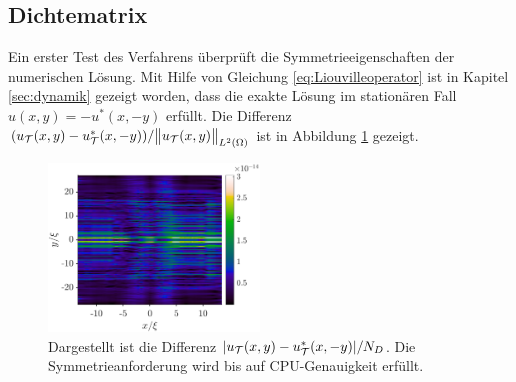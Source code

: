 \subsection{Dichtematrix}
Ein erster Test des Verfahrens überprüft die Symmetrieeigenschaften der numerischen Lösung. Mit Hilfe von Gleichung \eqref{eq:Liouvilleoperator} ist in Kapitel \ref{sec:dynamik} gezeigt worden, dass die exakte Lösung im stationären Fall $u(x,y) = -u^*(x,-y)$ erfüllt. Die Differenz $(u_{\mathcal{T}}(x,y)-u_{\mathcal{T}}^*(x,-y))/\norm{u_{\mathcal{T}}(x,y)}_{L^2(\Omega)}$ ist in Abbildung \ref{fig:parity} gezeigt.
\begin{figure}
  \centering
  \includegraphics[width=0.5\textwidth]{plots/parity_abs.eps}
  \caption{Dargestellt ist die Differenz $|u_{\mathcal{T}}(x,y)-u_{\mathcal{T}}^*(x,-y)|/N_D$. Die Symmetrieanforderung  wird bis auf CPU-Genauigkeit erfüllt.}
  \label{fig:parity}
\end{figure}

